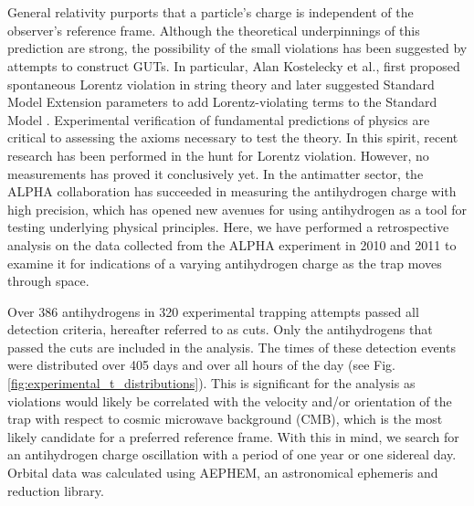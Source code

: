 \documentclass[superscriptaddress,aps,prb,11pt]{revtex4-1}
\begin{document}
\section{}
General relativity purports that a particle's charge is independent of the observer's reference frame.  Although the theoretical underpinnings of this prediction are strong, the possibility of the small violations has been suggested by attempts to construct GUTs. In particular, Alan Kostelecky et al., first proposed spontaneous Lorentz violation in string theory \cite{kostelecky1989spontaneous} and later suggested Standard Model Extension parameters to add Lorentz-violating terms to the Standard Model \cite{colladay1998lorentz}. Experimental verification of fundamental predictions of physics are critical to assessing the axioms necessary to test the theory.  In this spirit, recent research has been performed in the hunt for Lorentz violation\cite{kostelecky2011data}. However, no measurements has proved it conclusively yet. In the antimatter sector, the ALPHA collaboration has succeeded in measuring the antihydrogen charge with high precision\cite{amol:14a}, which has opened new avenues for using antihydrogen as a tool for testing underlying physical principles.  Here, we have performed a retrospective analysis on the data collected from the ALPHA experiment in 2010 and 2011 to examine it for indications of a varying antihydrogen charge as the trap moves through space.

Over 386 antihydrogens in 320 experimental trapping attempts passed all detection criteria, hereafter referred to as cuts\cite{amol:14a}.  Only the antihydrogens that passed the cuts are included in the analysis.  The times of these detection events were distributed over 405 days and over all hours of the day (see Fig.\ref{fig:experimental_t_distributions}).  This is significant for the analysis as violations would likely be correlated with the velocity and/or orientation of the trap with respect to cosmic microwave background (CMB), which is the most likely candidate for a preferred reference frame. With this in mind, we search for an antihydrogen charge oscillation with a period of one year or one sidereal day. Orbital data was calculated using AEPHEM\cite{aephem}, an astronomical ephemeris and reduction library.
\end{document}
